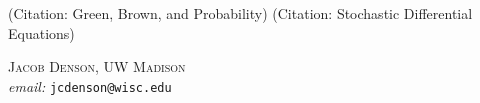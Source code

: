 \documentclass[12pt]{article}
\newtheorem{corollary}[theorem]{Corollary}
\newcommand*{\R}{\mathbb{R}}
\begin{document}
\begin{comment}
The proof will show one can generalize this result to $\Sigma$ formed from a finite union of embedded manifolds admissable up to a distance $\lambda^{-1}$, provided these manifolds are sufficiently transversal to one another. This leads to a new proof of a class result due to Hayman.

\begin{corollary}
    There exists $c \geq 1/900$ such that if $\Omega \subset \R^2$ is simply connected with \emph{inradius} $\rho$ ($\rho$ is the largest radius of a ball contained in $\Omega$), $\lambda_1(\Omega) \geq c/\rho^2$.
\end{corollary}

TODO: DO WE EXPECT DENSITY OF THE NODAL SET FOR LARGE $\lambda$, i.e. $\lambda^{-1}$ density.

\end{comment}

(Citation: Green, Brown, and Probability)
(Citation: Stochastic Differential Equations)

\begin{thebibliography}{3}

\end{thebibliography}

\noindent \textsc{Jacob Denson, UW Madison}\\
\textit{email:} \texttt{jcdenson@wisc.edu}
\end{document}
